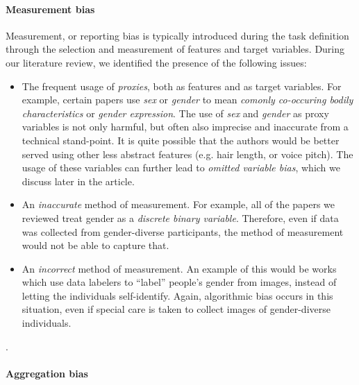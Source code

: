 \documentclass[sigconf,review,balance=false]{acmart}
\begin{document}
\paragraph*{Measurement bias} Measurement, or reporting bias is typically introduced during the task definition through the selection and measurement of features and target variables. During our literature review, we identified the presence of the following issues:
\begin{itemize}
    \item The frequent usage of \emph{proxies}, both as features and as target variables. For example, certain papers use \emph{sex} or \emph{gender} to mean \emph{comonly co-occuring bodily characteristics} or \emph{gender expression}.
    The use of \emph{sex} and \emph{gender} as proxy variables is not only harmful, but often also imprecise and inaccurate from a technical stand-point. It is quite possible that the authors would be better served using other less abstract features (e.g. hair length, or voice pitch). The usage of these variables can further lead to \emph{omitted variable bias}, which we discuss later in the article.
    \item An \emph{inaccurate} method of measurement. For example, all of the papers we reviewed treat gender as a \emph{discrete binary variable}. Therefore, even if data was collected from gender-diverse participants, the method of measurement would not be able to capture that.
    \item An \emph{incorrect} method of measurement. An example of this would be works which use data labelers to ``label'' people's gender from images, instead of letting the individuals self-identify. Again, algorithmic bias occurs in this situation, even if special care is taken to collect images of gender-diverse individuals.
\end{itemize}.

\paragraph*{Aggregation bias} 
\end{document}
